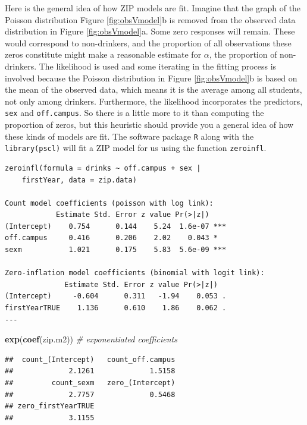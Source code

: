 \documentclass[
]{krantz}
\newenvironment{Shaded}{\begin{snugshade}}{\end{snugshade}}
\newcommand{\CommentTok}[1]{\textcolor[rgb]{0.37,0.37,0.37}{\textit{#1}}}
\newcommand{\KeywordTok}[1]{\textcolor[rgb]{0.27,0.27,0.27}{\textbf{#1}}}
\newcommand{\NormalTok}[1]{#1}
\begin{document}
Here is the general idea of how ZIP models are fit. Imagine that the graph of the Poisson distribution Figure \ref{fig:obsVmodel}b is removed from the observed data distribution in Figure \ref{fig:obsVmodel}a. Some zero responses will remain. These would correspond to non-drinkers, and the proportion of all observations these zeros constitute might make a reasonable estimate for \(\alpha\), the proportion of non-drinkers. The likelihood is used and some iterating in the fitting process is involved because the Poisson distribution in Figure \ref{fig:obsVmodel}b is based on the mean of the observed data, which means it is the average among all students, not only among drinkers. Furthermore, the likelihood incorporates the predictors, \texttt{sex} and \texttt{off.campus}. So there is a little more to it than computing the proportion of zeros, but this heuristic should provide you a general idea of how these kinds of models are fit. The software package \texttt{R} along with the \texttt{library(pscl)} will fit a ZIP model for us using the function \texttt{zeroinfl}.

\begin{verbatim}
zeroinfl(formula = drinks ~ off.campus + sex | 
    firstYear, data = zip.data)

Count model coefficients (poisson with log link):
            Estimate Std. Error z value Pr(>|z|)    
(Intercept)    0.754      0.144    5.24  1.6e-07 ***
off.campus     0.416      0.206    2.02    0.043 *  
sexm           1.021      0.175    5.83  5.6e-09 ***

Zero-inflation model coefficients (binomial with logit link):
              Estimate Std. Error z value Pr(>|z|)  
(Intercept)     -0.604      0.311   -1.94    0.053 .
firstYearTRUE    1.136      0.610    1.86    0.062 .
---
\end{verbatim}

\begin{Shaded}
\begin{Highlighting}[]
\KeywordTok{exp}\NormalTok{(}\KeywordTok{coef}\NormalTok{(zip.m2))   }\CommentTok{# exponentiated coefficients}
\end{Highlighting}
\end{Shaded}

\begin{verbatim}
##  count_(Intercept)   count_off.campus 
##             2.1261             1.5158 
##         count_sexm   zero_(Intercept) 
##             2.7757             0.5468 
## zero_firstYearTRUE 
##             3.1155
\end{verbatim}
\end{document}
